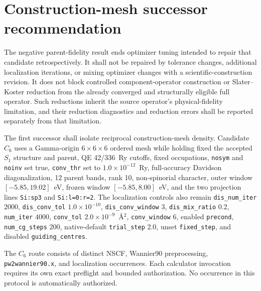 \documentclass[11pt]{article}
\begin{document}
\section{Construction-mesh successor recommendation}

The negative parent-fidelity result ends optimizer tuning intended to repair that
candidate retrospectively.  It shall not be repaired by tolerance changes, additional
localization iterations, or mixing optimizer changes with a scientific-construction
revision.  It does not block controlled component-operator construction or
Slater--Koster reduction from the already converged and structurally eligible full
operator.  Such reductions inherit the source operator's physical-fidelity limitation,
and their reduction diagnostics and reduction errors shall be reported separately from
that limitation.

The first successor shall isolate reciprocal construction-mesh density.  Candidate
$C_6$ uses a Gamma-origin $6\times6\times6$ ordered mesh while holding fixed the accepted
$S_1$ structure and parent, QE 42/336~Ry cutoffs, fixed occupations,
\texttt{nosym} and \texttt{noinv} set true, \texttt{conv\_thr} set to
$1.0\times10^{-12}$~Ry, full-accuracy Davidson diagonalization, 12 parent bands,
rank 10, non-spinorial character, outer window
$[-5.85,19.02]$~eV, frozen window $[-5.85,8.00]$~eV, and the two projection lines
\texttt{Si:sp3} and \texttt{Si:l=0:r=2}.  The localization controls also remain
\texttt{dis\_num\_iter} 2000, \texttt{dis\_conv\_tol} $1.0\times10^{-10}$,
\texttt{dis\_conv\_window} 3, \texttt{dis\_mix\_ratio} 0.2,
\texttt{num\_iter} 4000, \texttt{conv\_tol} $2.0\times10^{-9}$~\AA$^2$,
\texttt{conv\_window} 6, enabled \texttt{precond}, \texttt{num\_cg\_steps} 200,
native-default \texttt{trial\_step} 2.0, unset \texttt{fixed\_step}, and disabled
\texttt{guiding\_centres}.

The $C_6$ route consists of distinct NSCF, Wannier90 preprocessing,
\texttt{pw2wannier90.x}, and localization occurrences.  Each calculator invocation
requires its own exact preflight and bounded authorization.  No occurrence in this
protocol is automatically authorized.
\end{document}
